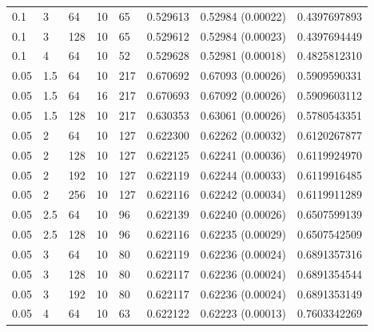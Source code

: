 \begin{tabular}{llllllll}
0.1 & 3 & 64 & 10 & 65 & 0.529613 & 0.52984 (0.00022) & 0.4397697893\\
0.1 & 3 & 128 & 10 & 65 & 0.529612 & 0.52984 (0.00023) & 0.4397694449\\
0.1 & 4 & 64 & 10 & 52 & 0.529628 & 0.52981 (0.00018) & 0.4825812310\\
\midrule
0.05 & 1.5 & 64 & 10 & 217 & 0.670692 & 0.67093 (0.00026) & 0.5909590331\\
0.05 & 1.5 & 64 & 16 & 217 & 0.670693 & 0.67092 (0.00026) & 0.5909603112\\
0.05 & 1.5 & 128 & 10 & 217 & 0.630353 & 0.63061 (0.00026) & 0.5780543351\\
0.05 & 2 & 64 & 10 & 127 & 0.622300 & 0.62262 (0.00032) & 0.6120267877\\
0.05 & 2 & 128 & 10 & 127 & 0.622125 & 0.62241 (0.00036) & 0.6119924970\\
0.05 & 2 & 192 & 10 & 127 & 0.622119 & 0.62244 (0.00033) & 0.6119916485\\
0.05 & 2 & 256 & 10 & 127 & 0.622116 & 0.62242 (0.00034) & 0.6119911289\\
0.05 & 2.5 & 64 & 10 & 96 & 0.622139 & 0.62240 (0.00026) & 0.6507599139\\
0.05 & 2.5 & 128 & 10 & 96 & 0.622116 & 0.62235 (0.00029) & 0.6507542509\\
0.05 & 3 & 64 & 10 & 80 & 0.622119 & 0.62236 (0.00024) & 0.6891357316\\
0.05 & 3 & 128 & 10 & 80 & 0.622117 & 0.62236 (0.00024) & 0.6891354544\\
0.05 & 3 & 192 & 10 & 80 & 0.622117 & 0.62236 (0.00024) & 0.6891353149\\
0.05 & 4 & 64 & 10 & 63 & 0.622122 & 0.62223 (0.00013) & 0.7603342269\\
\bottomrule
\end{tabular}
